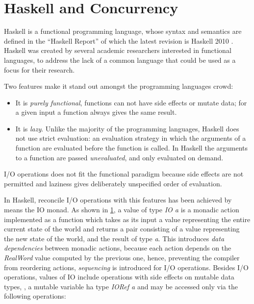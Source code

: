 
\chapter{Haskell and Concurrency}

Haskell is a functional programming language, whose syntax and semantics are defined in the ``Haskell Report'' of which the latest revision is Haskell 2010 \cite{Marlow_haskell2010}. Haskell was created by several academic researchers interested in functional languages, to address the lack of a common language that could be used as a focus for their research.

Two features make it stand out amongst the programming languages crowd:
\begin{itemize}
\item It is \emph{purely functional}, \ie functions can not have side effects or mutate data; for a given input a function always gives the same result.
\item It is \emph{lazy}. Unlike the majority of the programming languages, Haskell does not use strict evaluation: an evaluation strategy in which the arguments of a function are evaluated before the function is called. In Haskell the arguments to a function are passed \emph{unevaluated}, and only evaluated on demand.
\end{itemize}

I/O operations does not fit the functional paradigm because side effects are not permitted and laziness gives deliberately unspecified order of evaluation.

In Haskell, reconcile I/O operations with this features has been achieved by means the IO monad.\cite{PeytonJones:1993:IFP:158511.158524}
As shown in \cref{}, a value of type \emph{IO a} is a monadic action implemented as a function which takes as its input a value representing the entire current state of the world and returns a pair consisting of a value representing the new state of the world, and the result of type \emph{a}.
This introduces \emph{data dependencies} between monadic actions, because each action depends on the \emph{RealWord} value computed by the previous one, hence, preventing the compiler from reordering actions, \emph{sequencing} is introduced for I/O operations.
Besides I/O operations, values of IO include operations with side effects on mutable data types, \eg, a mutable variable ha type \emph{IORef a} and may be accessed only via the following operations:

